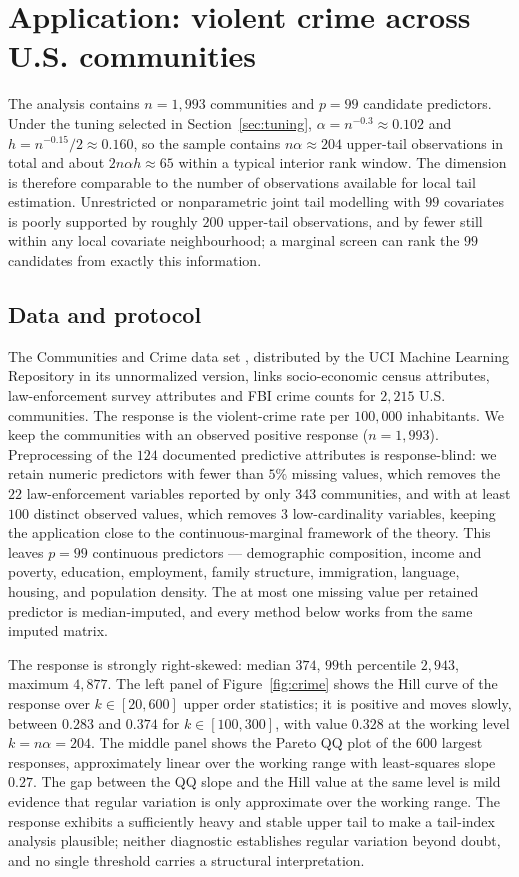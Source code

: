 \section{Application: violent crime across U.S. communities}
\label{sec:realdata}

The analysis contains $n=1{,}993$ communities and $p=99$ candidate
predictors. Under the tuning selected in Section~\ref{sec:tuning},
$\alpha=n^{-0.3}\approx0.102$ and $h=n^{-0.15}/2\approx0.160$, so the
sample contains $n\alpha\approx204$ upper-tail observations in total and
about $2n\alpha h\approx65$ within a typical interior rank window. The
dimension is therefore comparable to the number of observations
available for local tail estimation. Unrestricted or nonparametric joint
tail modelling with $99$ covariates is poorly supported by roughly $200$
upper-tail observations, and by fewer still within any local covariate
neighbourhood; a marginal screen can rank the $99$ candidates from
exactly this information.

\subsection{Data and protocol}

The Communities and Crime data set
\citep{redmond2002}, distributed by the UCI Machine Learning Repository
in its unnormalized version, links socio-economic census attributes,
law-enforcement survey attributes and FBI crime counts for $2{,}215$ U.S.
communities. The response is the violent-crime rate per $100{,}000$
inhabitants. We keep the communities with an observed positive response
($n=1{,}993$). Preprocessing of the $124$ documented predictive
attributes is response-blind: we retain numeric predictors with fewer
than $5\%$ missing values, which removes the $22$ law-enforcement
variables reported by only $343$ communities, and with at least $100$
distinct observed values, which removes $3$ low-cardinality variables,
keeping the application close to the continuous-marginal framework of
the theory. This leaves $p=99$ continuous predictors --- demographic
composition, income and poverty, education, employment, family
structure, immigration, language, housing, and population density. The
at most one missing value per retained predictor is median-imputed, and
every method below works from the same imputed matrix.

The response is strongly right-skewed: median $374$, $99$th percentile
$2{,}943$, maximum $4{,}877$. The left panel of Figure~\ref{fig:crime}
shows the Hill curve of the response over $k\in[20,600]$ upper order
statistics; it is positive and moves slowly, between $0.283$ and
$0.374$ for $k\in[100,300]$, with value $0.328$ at the working level
$k=n\alpha=204$. The middle panel shows the Pareto QQ plot of the $600$
largest responses, approximately linear over the working range with
least-squares slope $0.27$. The gap between the QQ slope and the Hill
value at the same level is mild evidence that regular variation is only
approximate over the working range. The response exhibits a
sufficiently heavy and stable upper tail to make a tail-index analysis
plausible; neither diagnostic establishes regular variation beyond
doubt, and no single threshold carries a structural interpretation.

